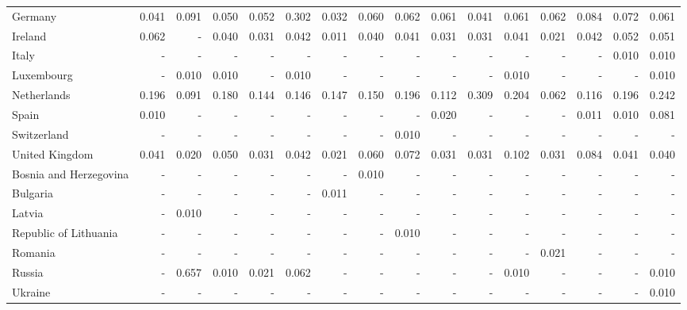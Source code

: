 \documentclass[10pt,twocolumn]{sig-alternate}
\begin{document}
\begin{table*}[t]
\begin{adjustbox}{width=1\textwidth}
\begin{tabular}{@{}ld{3.2}d{3.2}d{3.2}d{3.2}d{3.2}d{3.2}d{3.2}d{3.2}d{3.2}d{3.2}d{3.2}d{3.2}d{3.2}d{3.2}d{3.2}@{}}
Germany  & 0.041 & 0.091 & 0.050 & 0.052 & 0.302 & 0.032 & 0.060 & 0.062 & 0.061 & 0.041 & 0.061 & 0.062 & 0.084 & 0.072 & 0.061\\
Ireland  & 0.062 & -  & 0.040 & 0.031 & 0.042 & 0.011 & 0.040 & 0.041 & 0.031 & 0.031 & 0.041 & 0.021 & 0.042 & 0.052 & 0.051\\
Italy  & -  & -  & -  & -  & -  & -  & -  & -  & -  & -  & -  & -  & -  & 0.010 & 0.010\\
Luxembourg  & -  & 0.010 & 0.010 & -  & 0.010 & -  & -  & -  & -  & -  & 0.010 & -  & -  & -  & 0.010\\
Netherlands  & 0.196 & 0.091 & 0.180 & 0.144 & 0.146 & 0.147 & 0.150 & 0.196 & 0.112 & 0.309 & 0.204 & 0.062 & 0.116 & 0.196 & 0.242\\
Spain  & 0.010 & -  & -  & -  & -  & -  & -  & -  & 0.020 & -  & -  & -  & 0.011 & 0.010 & 0.081\\
Switzerland  & -  & -  & -  & -  & -  & -  & -  & 0.010 & -  & -  & -  & -  & -  & -  & - \\
United Kingdom  & 0.041 & 0.020 & 0.050 & 0.031 & 0.042 & 0.021 & 0.060 & 0.072 & 0.031 & 0.031 & 0.102 & 0.031 & 0.084 & 0.041 & 0.040\\ \hline
Bosnia and Herzegovina  & -  & -  & -  & -  & -  & -  & 0.010 & -  & -  & -  & -  & -  & -  & -  & - \\
Bulgaria  & -  & -  & -  & -  & -  & 0.011 & -  & -  & -  & -  & -  & -  & -  & -  & - \\
Latvia  & -  & 0.010 & -  & -  & -  & -  & -  & -  & -  & -  & -  & -  & -  & -  & - \\
Republic of Lithuania  & -  & -  & -  & -  & -  & -  & -  & 0.010 & -  & -  & -  & -  & -  & -  & - \\
Romania  & -  & -  & -  & -  & -  & -  & -  & -  & -  & -  & -  & 0.021 & -  & -  & - \\
Russia  & -  & 0.657 & 0.010 & 0.021 & 0.062 & -  & -  & -  & -  & -  & 0.010 & -  & -  & -  & 0.010\\
Ukraine  & -  & -  & -  & -  & -  & -  & -  & -  & -  & -  & -  & -  & -  & -  & 0.010\\ \hline

\end{tabular}
\end{adjustbox}
\end{table*}
\end{document}
